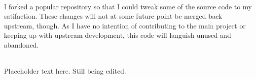 \documentclass{resume}
\begin{document}
\begin{minipage}[t]{0.67\textwidth}
\begin{resumestyle}
 \\
I forked a popular repository so that I could tweak some of the source code to
my satifaction. These changes will not at some future point be merged back
upstream, though. As I have no intention of contributing to the main project or
keeping up with upstream development, this code will languish unused and
abandoned.
\sectionsep%

 \\
Placeholder text here. Still being edited.

\end{resumestyle}



\begin{resumestyle}
\end{resumestyle}
\vspace{-2.0ex}




\end{minipage}
\end{document}
